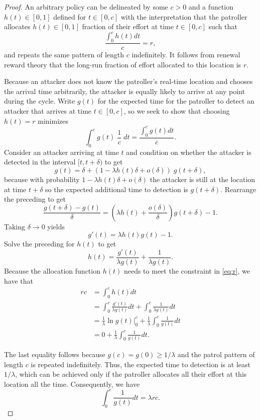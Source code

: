 \documentclass[10pt,a4paper]{amsart}
\begin{document}
\begin{proof}
An arbitrary policy can be delineated by some $c > 0$ and a function $h(t) \in [0,1]$ defined for $t \in [0,c]$ with the interpretation that the patroller allocates $h(t) \in [0,1]$ fraction of their effort at time $t \in [0,c]$ such that
\begin{equation}
\frac{\int_0^c h(t) dt}{c} = r,
\label{eq:r}
\end{equation}
and repeats the same pattern of length $c$ indefinitely.
It follows from renewal reward theory that the long-run fraction of effort allocated to this location is $r$.


Because an attacker does not know the patroller's real-time location and chooses the arrival time arbitrarily, the attacker is equally likely to arrive at any point during the cycle.
Write $g(t)$ for the expected time for the patroller to detect an attacker that arrives at time $t \in [0,c]$, so we seek to show that choosing $h(t) = r$ minimizes
\begin{equation}
\int_0^c g(t) \; \frac{1}{c} \; dt = \frac{\int_0^c g(t) dt}{c}.
\label{eq:obj}
\end{equation}
Consider an attacker arriving at time $t$ and condition on whether the attacker is detected in the interval $[t, t+ \delta)$ to get
\[
g(t) = \delta  + (1 - \lambda h(t) \delta + o (\delta)) \;  g(t+\delta),
\]
because with probability $1 - \lambda h(t) \delta + o (\delta)$ the attacker is still at the location at time $t + \delta$ so the expected additional time to detection is $g (t + \delta)$.
Rearrange the preceding to get
\[
\frac{g(t+ \delta) - g(t)}{\delta} = \left( \lambda h(t) + \frac{o(\delta)}{\delta} \right) g(t+ \delta) - 1.
\]
Taking $\delta \rightarrow 0$ yields
\[
g'(t) = \lambda h(t) g(t) -1.
\]
Solve the preceding for $h(t)$ to get
\[
h(t) = \frac{g'(t)}{\lambda g(t)} + \frac{1}{\lambda g(t)}.
\]
Because the allocation function $h(t)$ needs to meet the constraint in \eqref{eq:r}, we have that
\begin{align*}
r c 
&= \int_0^c h(t) dt \\
&= \int_0^c \frac{g'(t)}{\lambda g(t)} dt +  \int_0^c  \frac{1}{\lambda g(t)} dt \\
&= \frac{1}{\lambda} \ln g(t) \big|_0^c + \frac{1}{\lambda} \int_0^c \frac{1}{g(t)} dt \\
&= 0 + \frac{1}{\lambda} \int_0^c \frac{1}{g(t)} dt.
\end{align*}

The last equality follows because $g(c) = g(0) \geq 1/\lambda$ and the patrol pattern of length $c$ is repeated indefinitely. Thus, the expected time to detection is at least $1/\lambda$, which can be achieved only if the patroller allocates all their effort at this location all the time.
Consequently, we have
\[
\int_0^c \frac{1}{g(t)} dt = \lambda r c.
\]



\end{proof}
\end{document}
